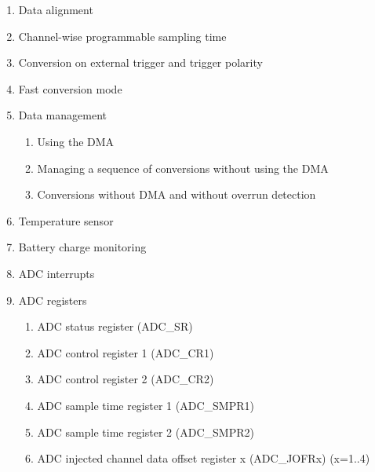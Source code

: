 \documentclass{article}
\begin{document}
\begin{enumerate}
\begin{enumerate}
\begin{enumerate}
            \item Single conversion mode 
            \item Continuous conversion mode 
            \item Timing diagram 
            \item Analog watchdog 
            \item Scan mode 
            \item Injected channel management 
            \item Discontinuous mode 
        \end{enumerate}
        \item Data alignment 
        \item Channel-wise programmable sampling time 
        \item Conversion on external trigger and trigger polarity 
        \item Fast conversion mode 
        \item Data management 
        \begin{enumerate}
            \item Using the DMA 
            \item Managing a sequence of conversions without using the DMA 
            \item Conversions without DMA and without overrun detection 
        \end{enumerate}
        \item Temperature sensor 
        \item Battery charge monitoring 
        \item ADC interrupts 
        \item ADC registers 
        \begin{enumerate}
            \item ADC status register (ADC\_SR) 
            \item ADC control register 1 (ADC\_CR1) 
            \item ADC control register 2 (ADC\_CR2) 
            \item ADC sample time register 1 (ADC\_SMPR1) 
            \item ADC sample time register 2 (ADC\_SMPR2) 
            \item ADC injected channel data offset register x (ADC\_JOFRx) (x=1..4) 

\end{enumerate}
\end{enumerate}
\end{enumerate}
\end{document}
